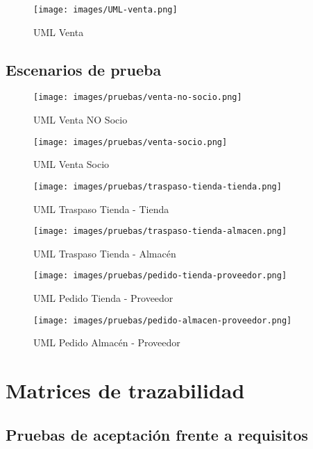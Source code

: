 \begin{figure}[H]
	\texttt{[image: images/UML-venta.png]}
	\caption{UML Venta}
\end{figure}

\subsection{Escenarios de prueba}

\begin{figure}[H]
	\texttt{[image: images/pruebas/venta-no-socio.png]}
	\caption{UML Venta NO Socio}
\end{figure}

\begin{figure}[H]
	\texttt{[image: images/pruebas/venta-socio.png]}
	\caption{UML Venta Socio}
\end{figure}

\begin{figure}[H]
	\texttt{[image: images/pruebas/traspaso-tienda-tienda.png]}
	\caption{UML Traspaso Tienda - Tienda}
\end{figure}

\begin{figure}[H]
	\texttt{[image: images/pruebas/traspaso-tienda-almacen.png]}
	\caption{UML Traspaso Tienda - Almacén}
\end{figure}

\begin{figure}[H]
	\texttt{[image: images/pruebas/pedido-tienda-proveedor.png]}
	\caption{UML Pedido Tienda - Proveedor}
\end{figure}

\begin{figure}[H]
	\texttt{[image: images/pruebas/pedido-almacen-proveedor.png]}
	\caption{UML Pedido Almacén - Proveedor}
\end{figure}

\section{Matrices de trazabilidad}

\subsection{Pruebas de aceptación frente a requisitos}

